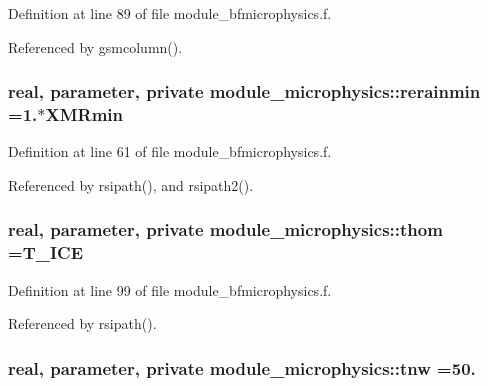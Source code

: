 Definition at line 89 of file module\+\_\+bfmicrophysics.\+f.



Referenced by gsmcolumn().

\subsubsection[{\texorpdfstring{rerainmin}{rerainmin}}]{\setlength{\rightskip}{0pt plus 5cm}real, parameter, private module\+\_\+microphysics\+::rerainmin =1.$\ast$X\+M\+Rmin\hspace{0.3cm}{\ttfamily [private]}}\hypertarget{namespacemodule__microphysics_a86f747f0e2a77aee3a2c8270a0f2fc6d}{}\label{namespacemodule__microphysics_a86f747f0e2a77aee3a2c8270a0f2fc6d}


Definition at line 61 of file module\+\_\+bfmicrophysics.\+f.



Referenced by rsipath(), and rsipath2().

\subsubsection[{\texorpdfstring{thom}{thom}}]{\setlength{\rightskip}{0pt plus 5cm}real, parameter, private module\+\_\+microphysics\+::thom =T\+\_\+\+I\+CE\hspace{0.3cm}{\ttfamily [private]}}\hypertarget{namespacemodule__microphysics_ae6cb25c6ef4d76e53988a1390c99bacb}{}\label{namespacemodule__microphysics_ae6cb25c6ef4d76e53988a1390c99bacb}


Definition at line 99 of file module\+\_\+bfmicrophysics.\+f.



Referenced by rsipath().

\subsubsection[{\texorpdfstring{tnw}{tnw}}]{\setlength{\rightskip}{0pt plus 5cm}real, parameter, private module\+\_\+microphysics\+::tnw =50.\hspace{0.3cm}{\ttfamily [private]}}\hypertarget{namespacemodule__microphysics_a7759795319d20ea93e3ceb6755333fa1}{}\label{namespacemodule__microphysics_a7759795319d20ea93e3ceb6755333fa1}



